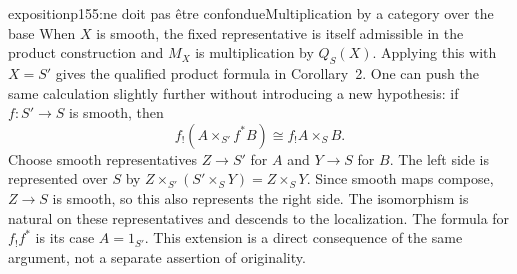 \begin{dcomment}{exposition}{p155:ne doit pas être confondue}{Multiplication by a category over the base}
When $X$ is smooth, the fixed representative is itself admissible in the product construction and $M_X$ is multiplication by $Q_S(X)$. Applying this with $X=S'$ gives the qualified product formula in Corollary~2. One can push the same calculation slightly further without introducing a new hypothesis: if $f:S'\to S$ is smooth, then
\[
 f_!(A\times_{S'}f^*B)\cong f_!A\times_SB.
\]
Choose smooth representatives $Z\to S'$ for $A$ and $Y\to S$ for $B$. The left side is represented over $S$ by $Z\times_{S'}(S'\times_SY)=Z\times_SY$. Since smooth maps compose, $Z\to S$ is smooth, so this also represents the right side. The isomorphism is natural on these representatives and descends to the localization. The formula for $f_!f^*$ is its case $A=1_{S'}$. This extension is a direct consequence of the same argument, not a separate assertion of originality.
\end{dcomment}

